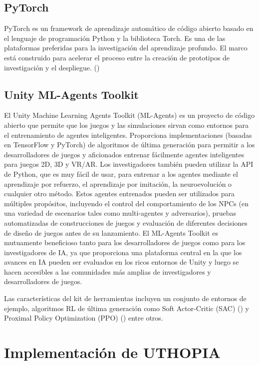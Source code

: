 \subsection{PyTorch}
 
PyTorch es un framework de aprendizaje automático de código abierto basado en el lenguaje de programación Python y la biblioteca Torch. Es una de las plataformas preferidas para la investigación del aprendizaje profundo. El marco está construido para acelerar el proceso entre la creación de prototipos de investigación y el despliegue. (\cite{NEURIPS2019_9015})
 
\subsection{Unity ML-Agents Toolkit}
 
El Unity Machine Learning Agents Toolkit (ML-Agents) es un proyecto de código abierto que permite que los juegos y las simulaciones sirvan como entornos para el entrenamiento de agentes inteligentes. Proporciona implementaciones (basadas en TensorFlow y PyTorch) de algoritmos de última generación para permitir a los desarrolladores de juegos y aficionados entrenar fácilmente agentes inteligentes para juegos 2D, 3D y VR/AR. Los investigadores también pueden utilizar la API de Python, que es muy fácil de usar, para entrenar a los agentes mediante el aprendizaje por refuerzo, el aprendizaje por imitación, la neuroevolución o cualquier otro método. Estos agentes entrenados pueden ser utilizados para múltiples propósitos, incluyendo el control del comportamiento de los NPCs (en una variedad de escenarios tales como multi-agentes y adversarios), pruebas automatizadas de construcciones de juegos y evaluación de diferentes decisiones de diseño de juegos antes de su lanzamiento. El ML-Agents Toolkit es mutuamente beneficioso tanto para los desarrolladores de juegos como para los investigadores de IA, ya que proporciona una plataforma central en la que los avances en IA pueden ser evaluados en los ricos entornos de Unity y luego se hacen accesibles a las comunidades más amplias de investigadores y desarrolladores de juegos. 
 
Las características del kit de herramientas incluyen un conjunto de entornos de ejemplo, algoritmos RL de última generación como Soft Actor-Critic (SAC) (\cite{haarnoja2018soft}) y Proximal Policy Optimization (PPO) (\cite{schulman2017proximal})  entre otros.
 
\section{Implementación de UTHOPIA}
 
